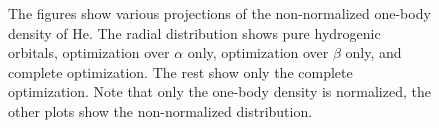 \documentclass[aps,prc,twocolumn,floatfix]{revtex4}
\begin{document}
\begin{figure}[ht]
\caption[Optional caption for list of figures]{The figures show various projections of the non-normalized one-body density of He. The radial distribution shows pure hydrogenic orbitals, optimization over $\alpha$ only, optimization over $\beta$ only, and complete optimization. The rest show only the complete optimization. Note that only the one-body density is normalized, the other plots show the non-normalized distribution.}
\label{fig:6}
\end{figure}
\end{document}
